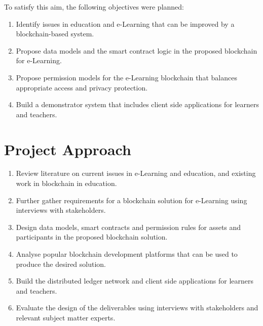 To satisfy this aim, the following objectives were planned:

\begin{enumerate}
    \item Identify issues in education and e-Learning that can be improved by a blockchain-based system.
    \item Propose data models and the smart contract logic in the proposed blockchain for e-Learning.
    \item Propose permission models for the e-Learning blockchain that balances appropriate access and privacy protection.
    \item Build a demonstrator system that includes client side applications for learners and teachers.
\end{enumerate}



\section{Project Approach} %

\begin{enumerate}
    \item Review literature on current issues in e-Learning and education, and existing work in blockchain in education.
    \item Further gather requirements for a blockchain solution for e-Learning using interviews with stakeholders.
    \item Design data models, smart contracts and permission rules for assets and participants in the proposed blockchain solution.
    \item Analyse popular blockchain development platforms that can be used to produce the desired solution.
    \item Build the distributed ledger network and client side applications for learners and teachers.
    \item Evaluate the design of the deliverables using interviews with stakeholders and relevant subject matter experts.
\end{enumerate}

